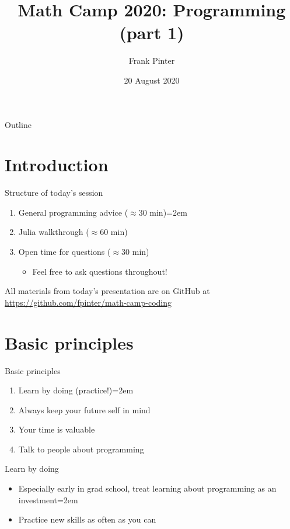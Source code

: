 \documentclass{beamer}
\title{Math Camp 2020: Programming (part 1)}
\author{Frank Pinter}
\date{20 August 2020}
\begin{document}
\begin{frame}
  \titlepage
\end{frame}

\begin{frame}{Outline}
  \tableofcontents
\end{frame}

\section*{Introduction}

\begin{frame}{Structure of today's session}
\begin{enumerate}
    \item General programming advice ($\approx 30$ min)\itemsep=2em
    \item Julia walkthrough ($\approx 60$ min)
    \item Open time for questions ($\approx 30$ min)
    \begin{itemize}
        \item Feel free to ask questions throughout!
    \end{itemize}
\end{enumerate}
\vspace{0.5in}
All materials from today's presentation are on GitHub at \\
\url{https://github.com/fpinter/math-camp-coding}
\end{frame}

\section{Basic principles}

\begin{frame}{Basic principles}
    \begin{enumerate}
        \item Learn by doing (practice!)\itemsep=2em
        \item Always keep your future self in mind
        \item Your time is valuable
        \item Talk to people about programming
    \end{enumerate}
\end{frame}

\begin{frame}{Learn by doing}
    \begin{itemize}
        \item Especially early in grad school, treat learning about programming as an investment\itemsep=2em
        \item Practice new skills as often as you can
    \end{itemize}
\end{frame}
\end{document}

